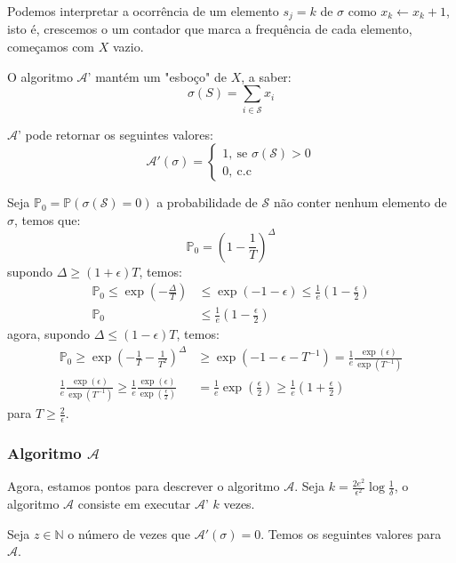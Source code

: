 Podemos interpretar a ocorrência de um elemento $s_j = k$ de $\sigma$ como $x_k \leftarrow x_k + 1$, isto é, crescemos o um contador que marca a frequência de cada elemento, começamos com $X$ vazio. 

O algoritmo $\mathcal{A}$' mantém um "esboço" de $X$, a saber:
$$\sigma(S) = \sum_{i \in \mathcal{S}}x_i$$

$\mathcal{A}$' pode retornar os seguintes valores:
\[
   \mathcal{A}'(\sigma) = \begin{cases} 
                    1,\ \text{se }\sigma(\mathcal{S}) > 0\\ 
                    0,\ \text{c.c }\end{cases}
\]


Seja $\mathbb{P}_0 = \mathbb{P}(\sigma(\mathcal{S})= 0)$ a probabilidade de $\mathcal{S}$ não conter nenhum elemento de $\sigma$, temos que:
\begin{equation*}
\mathbb{P}_0 = \left(1-\frac{1}{T} \right)^\Delta    
\end{equation*}
supondo $\Delta \geq (1+\epsilon)T$, temos:
\begin{align*}
    \mathbb{P}_0 \leq \exp(-\frac{\Delta}{T}) &\leq \exp(-1-\epsilon) \leq \frac{1}{e} \left(1-\frac{\epsilon}{2}\right)\\
    \mathbb{P}_0 &\leq \frac{1}{e} \left(1-\frac{\epsilon}{2}\right)
\end{align*}
agora, supondo $\Delta \leq (1-\epsilon)T$, temos:
\begin{align*}
    \mathbb{P}_0 \geq \exp(-\frac{1}{T}-\frac{1}{T^2})^\Delta &\geq \exp(-1-\epsilon-T^{-1}) = \frac{1}{e}\frac{\exp(\epsilon)}{\exp(T^{-1})}\\
     \frac{1}{e}\frac{\exp(\epsilon)}{\exp(T^{-1})} \geq \frac{1}{e}\frac{\exp(\epsilon)}{\exp(\frac{\epsilon}{2})} &=\frac{1}{e}\exp(\frac{\epsilon}{2}) \geq \frac{1}{e}\left(1+\frac{\epsilon}{2}\right)
\end{align*}
para $T \geq \frac{2}{\epsilon}$.

\subsubsection{Algoritmo $\mathcal{A}$}Agora, estamos pontos para descrever o algoritmo $\mathcal{A}$. Seja $k =\frac{2e^2}{\epsilon^2}\log{\frac{1}{\delta}}$, o algoritmo $\mathcal{A}$ consiste em executar $\mathcal{A}$' $k$ vezes. 


Seja $z \in \mathbb{N}$ o número de vezes que $\mathcal{A}'(\sigma)=0$. Temos os seguintes valores para $\mathcal{A}$.

